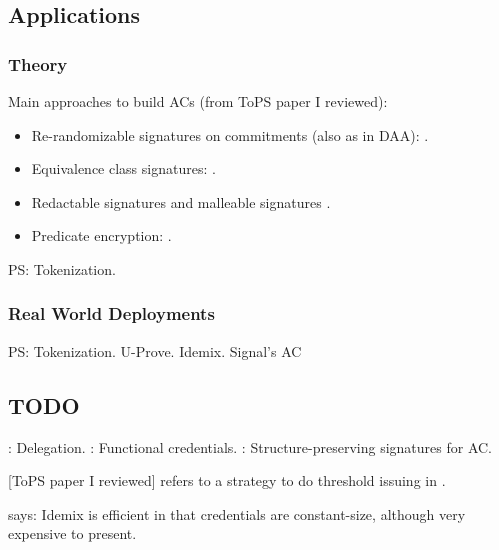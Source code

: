 
\subsection{Applications}
\label{ssec:acapplication}

\subsubsection{Theory}
\label{sssec:actheoryapp}

Main approaches to build ACs (from ToPS paper I reviewed):

\begin{itemize}
\item Re-randomizable signatures on commitments (also as in DAA):
  \cite{cl02,cl04,lmpy16,ps16}.
\item Equivalence class signatures: \cite{fhs19,hs14}.
\item Redactable signatures \cite{cdhk15,sand20} and malleable signatures
  \cite{ckl14}.
\item Predicate encryption: \cite{dmm+18}.
\end{itemize}

PS: Tokenization.

\subsubsection{Real World Deployments}
\label{sssec:acrwdeploy}

PS: Tokenization.
U-Prove.
Idemix.
Signal's AC \needcite

\subsection{TODO}

\cite{bcc+09}: Delegation.
\cite{dmm+18}: Functional credentials.
\cite{fhs19}: Structure-preserving signatures for AC.

[ToPS paper I reviewed] refers to a strategy to do threshold issuing in \cite{bbh06}.

\cite{cmz14} says: Idemix is efficient in that credentials are constant-size,
although very expensive to present.



